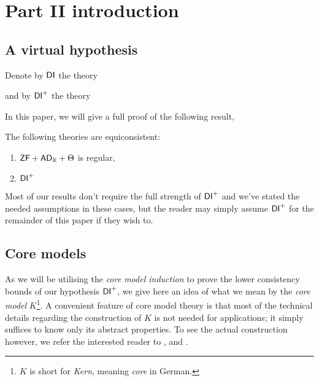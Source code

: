 \documentclass[../../main]{subfiles}
\begin{document}
\chapter{Part II introduction}
\thispagestyle{fancy}


\section{A virtual hypothesis}


\qquad Denote by $\operatorname{\textsf{DI}}$ the theory

and by $\operatorname{\textsf{DI}}^+$ the theory

In this paper, we will give a full proof of the following result,

\begin{theorem}
  The following theories are equiconsistent:
  \begin{enumerate}
    \item $\textsf{ZF} + \textsf{AD}_{\mathbb{R}} + \Theta$ is regular,
    \item $\operatorname{\textsf{DI}}^+$
  \end{enumerate}
\end{theorem}

Most of our results don't require the full strength of $\operatorname{\textsf{DI}}^+$ and we've stated the needed assumptions in these cases, but the reader may simply assume $\operatorname{\textsf{DI}}^+$ for the remainder of this paper if they wish to.


\section{Core models}

As we will be utilising the \textit{core model induction} to prove the lower consistency bounds of our hypothesis $\operatorname{\textsf{DI}}^+$, we give here an idea of what we mean by the \textit{core model} $K$\footnote{$K$ is short for \textit{Kern}, meaning \textit{core} in German.}. A convenient feature of core model theory is that most of the technical details regarding the construction of $K$ is not needed for applications; it simply suffices to know only its abstract properties. To see the actual construction however, we refer the interested reader to \cite{MSc}, \cite{Zeman} and \cite{Kwithoutmeasurable}.
\end{document}
